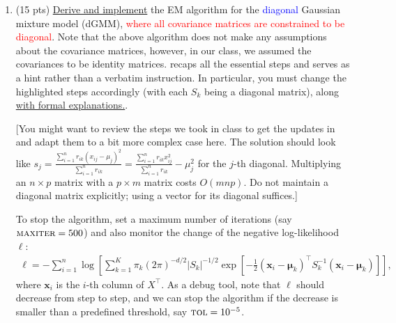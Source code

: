 \documentclass[10pt,letter,notitlepage]{article}
\newcommand{\xv}{\mathbf{x}}
\newcommand{\blue}[1]{{\color{blue}#1}}
\newcounter{exercise}
\begin{document}
\begin{exercise}
	\begin{enumerate}
		\item (15 pts) \underline{Derive and implement} the EM algorithm for the \textcolor{blue}{diagonal} Gaussian mixture model (dGMM), \textcolor{red}{where all covariance matrices are constrained to be diagonal}. Note that the above algorithm does not make any assumptions about the covariance matrices, however, in our class, we assumed the covariances to be identity matrices.  recaps all the essential steps and serves as a hint rather than a verbatim instruction. In particular, you must change the highlighted steps accordingly (with each $S_k$ being a diagonal matrix), along \underline{with formal explanations.}. 
		
		[You might want to review the steps we took in class to get the updates in  and adapt them to a bit more complex case here. The solution should look like $s_j = \frac{\sum_{i=1}^n r_{ik} (x_{ij} - \mu_j)^2}{\sum_{i=1}^n r_{ik} } = \frac{\sum_{i=1}^n r_{ik} x_{ij} ^2}{\sum_{i=1}^n r_{ik} } - \mu_j^2$ for the $j$-th diagonal. Multiplying an $n\times p$ matrix with a $p\times m$ matrix costs $O(mnp)$. Do not maintain a diagonal matrix explicitly; using a vector for its diagonal suffices.]
		
		To stop the algorithm, set a maximum number of iterations (say $\textsc{maxiter} = 500$) and also monitor the change of the negative log-likelihood $\ell$: 
		\begin{align}
		\ell = -\sum_{i=1}^n \log\left[\sum_{k=1}^K \pi_k  (2\pi)^{-d/2} |S_k|^{-1/2} \exp[ -\tfrac{1}{2}(\xv_i -\boldsymbol{\mu}_k)^\top S_k^{-1} (\xv_i - \boldsymbol{\mu}_k ) ]\right],
		\end{align}
		where $\xv_i$ is the $i$-th column of $X^\top$.
		\blue{As a debug tool, note that $\ell$ should decrease from step to step}, and we can stop the algorithm if the decrease is smaller than a predefined threshold, say $\textsc{tol} = 10^{-5}$.
		

\end{enumerate}
\end{exercise}
\end{document}

